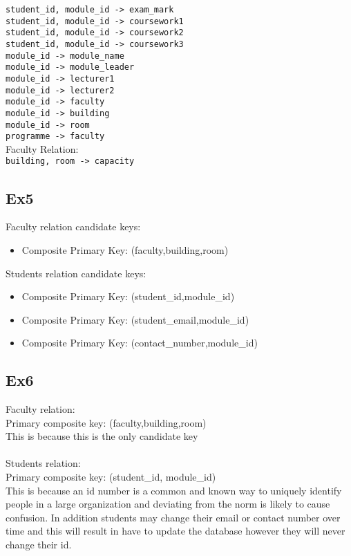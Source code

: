 \documentclass{article}
\begin{document}
\noindent
\verb|student_id, module_id -> exam_mark|\\
\verb|student_id, module_id -> coursework1|\\
\verb|student_id, module_id -> coursework2|\\
\verb|student_id, module_id -> coursework3|\\

\noindent
\verb|module_id -> module_name|\\
\verb|module_id -> module_leader|\\
\verb|module_id -> lecturer1|\\
\verb|module_id -> lecturer2|\\
\verb|module_id -> faculty|\\
\verb|module_id -> building|\\
\verb|module_id -> room|\\

\noindent
\verb|programme -> faculty|\\


\noindent
Faculty Relation:\\
\verb|building, room -> capacity|

\subsection{Ex5}
Faculty relation candidate keys:
\begin{itemize}
    \item Composite Primary Key: (faculty,building,room)
\end{itemize}

\noindent
Students relation candidate keys:
\begin{itemize}
    \item Composite Primary Key:
    (student\_id,module\_id)
    \item Composite Primary Key:
    (student\_email,module\_id)
    \item Composite Primary Key:
    (contact\_number,module\_id)
\end{itemize}

\subsection{Ex6}
{\large Faculty relation:}\\
Primary composite key: (faculty,building,room)\\
This is because this is the only candidate key\\\\
{\large Students relation:}\\
Primary composite key: (student\_id, module\_id)\\
This is because an id number is a common and known way to uniquely identify people in a large organization and deviating from the norm is likely to cause confusion. In addition students may change their email or contact number over time and this will result in have to update the database however they will never change their id. 
\end{document}
